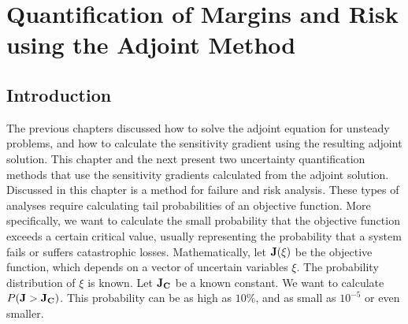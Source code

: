 \chapter[Quantification of Risk using the Adjoint Method]
        {Quantification of Margins and Risk using the Adjoint Method}

\section{Introduction}
The previous chapters discussed how to solve the adjoint equation for unsteady
problems, and how to calculate the sensitivity gradient using the resulting
adjoint solution.
This chapter and the next present two uncertainty quantification
methods that use the sensitivity gradients calculated from the adjoint solution.
Discussed in this chapter is a method for failure and
risk analysis.  These types of analyses require calculating tail probabilities
of an objective function.  More specifically, we want to calculate the
small probability that the objective function exceeds a certain critical value,
usually representing the probability that a system fails or suffers
catastrophic losses.
Mathematically, let ${\bf J}(\xi)$ be the objective function,
which depends on a vector of uncertain variables $\xi$.  The probability
distribution of $\xi$ is known.  Let ${\bf J_C}$ be a known constant.
We want to calculate $P({\bf J} > {\bf J_C})$.  This probability can be as
high as $10\%$, and as small as $10^{-5}$ or even smaller.

